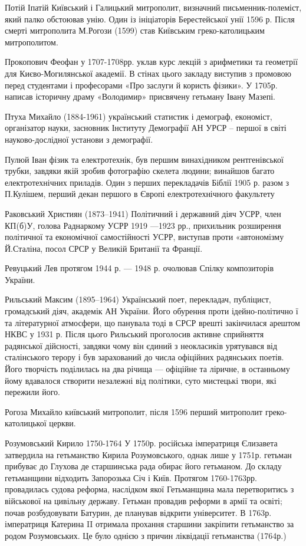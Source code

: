 Потій Іпатій  Київський і Галицький митрополит, визначний письменник-полеміст, який палко обстоював унію. Один із ініціаторів Берестейської унії 1596 р. Після смерті митрополита М.Рогози (1599) став Київським греко-католицьким митрополитом.

Прокопович Феофан  у 1707-1708рр. уклав курс лекцій з арифметики та геометрії для Києво-Могилянської академії. В стінах цього закладу виступив з промовою перед студентами і професорами «Про заслуги й користь фізики». У 1705р. написав історичну драму «Володимир» присвячену гетьману Івану Мазепі.

Птуха Михайло (1884-1961) український статистик і демограф, економіст, організатор науки, засновник Інституту Демографії АН УРСР – першої в світі науково-дослідної установи з демографії.

Пулюй Іван фізик та електротехнік, був першим винахідником рентгенівської трубки, завдяки якій зробив фотографію скелета людини; винайшов багато електротехнічних при­ладів. Один з перших перекладачів Біблії 1905 р. разом з П.Кулішем, перший декан першого в Європі електротехнічного факультету 

Раковський Християн (1873–1941) Політичний і державний діяч УСРР, член КП(б)У, голова Раднаркому УСРР 1919 —1923 рр., прихильник розширення політичної та економічної самостійності УСРР, виступав проти «автономізму Й.Сталіна, посол СРСР у Великій Британії та Франції.

Ревуцький Лев протягом 1944 р. — 1948 р. очолював Спілку композиторів України. 

Рильський Максим (1895–1964) Український поет, перекладач, публіцист, громадський діяч, академік АН України. Його обурення проти ідейно-політично ї та літературної атмосфери, що панувала тоді в СРСР врешті закінчилася арештом НКВС у 1931 р. Після цього Рильський проголосив активне сприйняття радянської дійсності, завдяки чому він єдиний з неокласиків урятувався від сталінського терору і був зарахований до числа офіційних радянських поетів. Його творчість поділилась на два річища — офіційне та ліричне, в останньому йому вдавалося створити незалежні від політики, суто мистецькі твори, які пережили його.

Рогоза Михайло  київський митрополит, після 1596 перший митрополит греко-католицької церкви.

Розумовський Кирило  1750-1764 У 1750р. російська імператриця Єлизавета затвердила на гетьманство Кирила Розумовського, однак лише у 1751р. гетьман прибуває до Глухова де старшинська рада обирає його гетьманом. До складу гетьманщини відходить Запорозька Січ і Київ. Протягом 1760-1763рр. провадилась судова реформа, наслідком якої Гетьманщина мала перетворитись з військової на цивільну державу. Гетьман провадив реформи в армії та освіті; почав розбудовувати Батурин, де планував відкрити університет. В 1763р. імператриця Катерина II отримала прохання старшини закріпити гетьманство за родом Розумовських. Це було однією з причин ліквідації гетьманства (1764р.)

